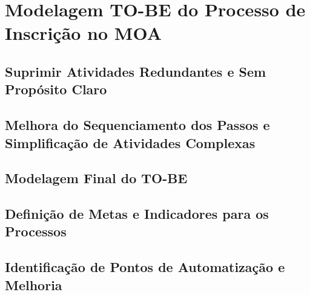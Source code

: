 \chapter[Modelagem TO-BE do Processo de Inscrição no MOA]{Modelagem TO-BE do Processo de Inscrição no MOA}
\label{chap:processotobe}
	

	\section[Suprimir Atividades Redundantes e Sem Propósito Claro]{Suprimir Atividades Redundantes e Sem Propósito Claro}
	\label{sec:processotobe_suprimir}
		

	\section[Melhora do Sequenciamento dos Passos e Simplificação de Atividades Complexas]{Melhora do Sequenciamento dos Passos e Simplificação de Atividades Complexas}
	\label{sec:processotobe_simplificar}
		

	\section[Modelagem Final do TO-BE]{Modelagem Final do TO-BE}
	\label{sec:processotobe_final}
		

	\section[Definição de Metas e Indicadores para os Processos]{Definição de Metas e Indicadores para os Processos}
	\label{sec:processotobe_metas}
		

	\section[Identificação de Pontos de Automatização e Melhoria]{Identificação de Pontos de Automatização e Melhoria}
	\label{sec:processotobe_pontos}
		